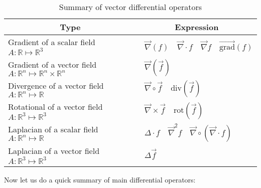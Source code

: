 	\begin{table}[H]
		\begin{center}
				\begin{tabular}{|p{8cm}|p{6cm}|}
					\hline
					\multicolumn{1}{c}{\cellcolor{black!30}\textbf{Type}} & 
	  \multicolumn{1}{c}{\cellcolor{black!30}\textbf{Expression}} \\ \hline
					Gradient of a scalar field $A:\mathbb{R}\mapsto \mathbb{R}^3$ & \centering\arraybackslash\ $\vec{\nabla}(f) \quad \vec{\nabla}\cdot f \quad \vec{\nabla}f \quad \overrightarrow{\text{grad}}(f)$ \\ \hline
					Gradient of a vector field $A:\mathbb{R}^n\mapsto \mathbb{R}^n\times \mathbb{R}^n$ & \centering\arraybackslash\ $\vec{\nabla}(\vec{f})$  \\ \hline
					Divergence of a vector field $A:\mathbb{R}^n\mapsto \mathbb{R}$ & \centering\arraybackslash\ $\vec{\nabla}\circ \vec{f}\quad \text{div}(\vec{f})$  \\ \hline
					Rotational of a vector field $A:\mathbb{R}^3\mapsto \mathbb{R}^3$ & \centering\arraybackslash\ $\vec{\nabla}\times\vec{f}\quad \text{rot}(\vec{f})$  \\ \hline
					Laplacian of a scalar field $A:\mathbb{R}^n\mapsto \mathbb{R}$ & 		\centering\arraybackslash\ $\Delta \cdot f\quad \vec{\nabla}^2 f\quad \vec{\nabla}\circ(\vec{\nabla}\cdot f)$  \\ \hline
					Laplacian of a vector field $A:\mathbb{R}^3\mapsto \mathbb{R}^3$& \centering\arraybackslash\  $\Delta\vec{f}$  \\ \hline
			\end{tabular}
		\end{center}
		\caption{Summary of vector differential operators}
	\end{table}
	Now let us do a quick summary of main differential operators:
